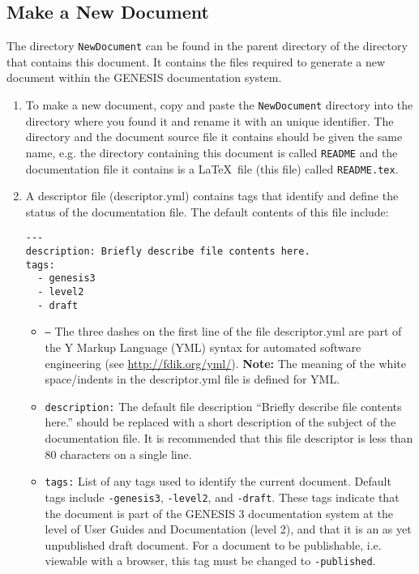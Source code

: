 \documentclass[12pt]{article}
\begin{document}
\subsection*{Make a New Document}

The directory {\tt NewDocument} can be found in the parent directory of the directory that contains this document. It contains the files required to generate a new document within the GENESIS documentation system.

\begin{enumerate}

\item To make a new document, copy and paste the {\tt NewDocument} directory into the directory where you found it and rename it with an unique identifier. The directory and the document source file it contains should be given the same name, e.g. the directory containing this document is called {\tt README} and the documentation file it contains is a \LaTeX\, file (this file) called {\tt README.tex}.

\item A descriptor file (descriptor.yml) contains tags that identify and define the status of the documentation file. The default contents of this file include:
\begin{verbatim}
---
description: Briefly describe file contents here. 
tags:
  - genesis3
  - level2
  - draft
\end{verbatim}

\begin{itemize}

\item {\tt ---} The three dashes on the first line of the file descriptor.yml are part of the Y Markup Language (YML) syntax for automated software engineering (see \href{http://fdik.org/yml/}{http://fdik.org/yml/}). {\bf Note:} The meaning of the white space/indents in the descriptor.yml file is defined for YML.  


\item {\tt description:} The default file description ``Briefly describe file contents here.'' should be replaced with a short description of the subject of the documentation file. It is recommended that this file descriptor is less than 80 characters on a single line.

\item {\tt tags:} List of any tags used to identify the current document. Default tags include {\tt -genesis3}, {\tt -level2}, and {\tt -draft}. These tags indicate that the document is part of the GENESIS 3 documentation system at the level of User Guides and Documentation (level 2), and that it is an as yet unpublished draft document. For a document to be publishable, i.e. viewable with a browser, this tag must be changed to {\tt -published}.

\end{itemize}

\end{enumerate}
\end{document}
